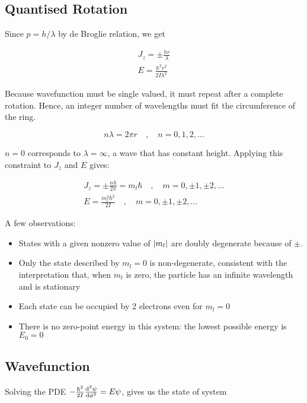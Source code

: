 \documentclass[11pt]{article}
\theoremstyle{definition}
\begin{document}
\subsection{Quantised Rotation}

Since $p = h/ \lambda$ by de Broglie relation, we get

\begin{gather*}
    J_z = \pm \frac{hr}{\lambda}\\
    E = \frac{h^2 r^2}{2I\lambda^2}
\end{gather*}

Because wavefunction must be single valued, it must repeat after a complete rotation. Hence, an
integer number of wavelengths must fit the circumference of
the ring.

\begin{equation*}
    n\lambda = 2\pi r \quad , \quad n = 0,1,2,\dots
\end{equation*}

$n=0$ corresponds to $\lambda = \infty$, a wave that has constant height. Applying this constraint to $J_z$ and $E$ gives:

\begin{gather*}
    J_z = \pm \frac{n h}{2\pi} = m_l \hbar \quad, \quad m = 0, \pm 1, \pm 2, \dots \\
    E = \frac{m_l^2 \hbar^2}{2I} \quad , \quad m = 0, \pm 1, \pm 2, \dots
\end{gather*}

A few observations:
\begin{itemize}
    \item States with a given nonzero value of $\abs{m_l}$ are doubly degenerate because of $\pm$.
    \item Only the state described by $m_l = 0$ is non-degenerate, consistent with the interpretation that, when $m_l$ is zero, the particle has an infinite wavelength and is stationary
    \item Each state can be occupied by 2 electrons even for $m_l = 0$
    \item There is no zero-point energy in this system: the lowest possible energy is $E_0 = 0$
\end{itemize}

\subsection{Wavefunction}

Solving the PDE $-\frac{\hbar^2}{2I} \dv[2]{\psi}{\phi} = E\psi$, gives us the state of system
\end{document}
